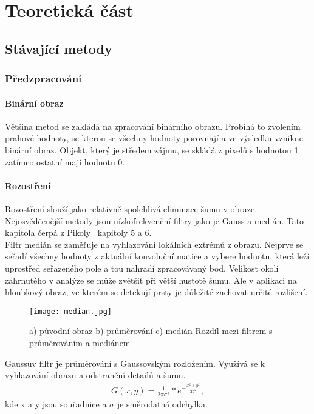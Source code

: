 \textit{}\chapter{Teoretická část}

\section{Stávající metody}
\subsection{Předzpracování}
\subsubsection{Binární obraz}
Většina metod se zakládá na zpracování binárního obrazu. Probíhá to zvolením prahové hodnoty, se kterou se všechny hodnoty porovnají a ve výsledku vznikne binární obraz. Objekt, který je středem zájmu, se skládá z pixelů s hodnotou 1 zatímco ostatní mají hodnotu 0.
\subsubsection{Rozostření}
Rozostření slouží jako relativně spolehlivá eliminace šumu v obraze. Nejosvědčenější metody jsou nízkofrekvenční filtry jako je Gauss a medián. Tato kapitola čerpá z Pikoly~\cite{15} kapitoly 5 a 6.\\

Filtr medián se zaměřuje na vyhlazování lokálních extrémů z obrazu. Nejprve se seřadí všechny hodnoty z aktuální konvoluční matice a vybere hodnotu, která leží uprostřed seřazeného pole a tou nahradí zpracovávaný bod. Velikost okolí zahrnutého v analýze se může zvětšit při větší hustotě šumu. Ale v aplikaci na hloubkový obraz, ve kterém se detekují prsty je důležité zachovat určité rozlišení.\\
\begin{figure}[h]
\centering
\texttt{[image: median.jpg]}
\caption{a) původní obraz b) průměrování c) medián
Rozdíl mezi filtrem s průměrováním a mediánem 
~\cite{15} }
\end{figure}


Gaussův filtr je průměrování s Gaussovským rozložením. Využívá se k vyhlazování obrazu a odstranění detailů a šumu. 
\begin{eqnarray}
G(x,y) = \frac{1}{2 \pi \sigma^{2}}*e^{-\frac{x^{2}+y^{2}}{2\sigma^{2}}}  ,
\end{eqnarray}
kde x a y jsou souřadnice a $ \sigma $ je směrodatná odchylka.\\

